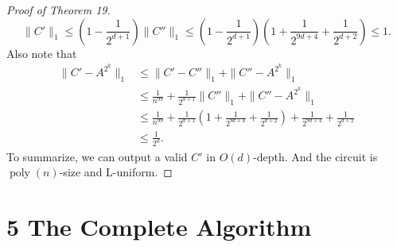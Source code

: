 \documentclass[10pt,a4paper]{article}
\begin{document}
\begin{proof}[Proof of Theorem 19]
\[\|C'\|_1\le\left(1-\frac1{2^{d+1}}\right)\|C''\|_1\le\left(1-\frac1{2^{d+1}}\right)\left(1+\frac1{2^{9d+4}}+\frac1{2^{d+2}}\right)\le1.\]
Also note that
\begin{align*}\|C'-A^{2^k}\|_1&\le\|C'-C''\|_1+\|C''-A^{2^k}\|_1\\&\le\frac1{n^{99}}+\frac1{2^{d+1}}\|C''\|_1+\|C''-A^{2^k}\|_1\\&\le\frac1{n^{99}}+\frac1{2^{d+1}}\left(1+\frac1{2^{9d+4}}+\frac1{2^{d+2}}\right)+\frac1{2^{9d+4}}+\frac1{2^{d+2}}\\&\le\frac1{2^d}.\end{align*}
To summarize, we can output a valid $C'$ in $O(d)$-depth. And the circuit is $\operatorname{poly}(n)$-size and L-uniform.
\end{proof}
\section*{5 The Complete Algorithm}
\end{document}
